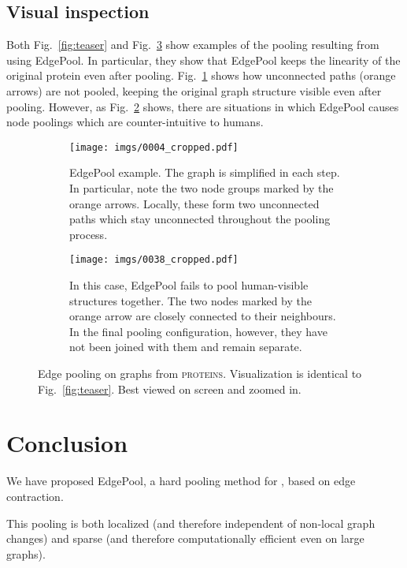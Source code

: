 \documentclass{article}
\newcommand{\figref}[1]{Fig.~\ref{#1}}
\newcommand{\edgepool}{EdgePool}
\newcommand{\datasetname}[1]{\textsc{#1}}
\newcommand{\proteins}{\datasetname{proteins}}
\begin{document}
\subsection{Visual inspection}

Both \figref{fig:teaser} and \figref{fig:plotted_graphs} show examples of the pooling resulting from using \edgepool{}. In particular, they show that \edgepool{} keeps the linearity of the original protein even after pooling. \figref{fig:pooling_example} shows how unconnected paths (orange arrows) are not pooled, keeping the original graph structure visible even after pooling. However, as \figref{fig:failure_case} shows, there are situations in which \edgepool{} causes node poolings which are counter-intuitive to humans.

\begin{figure}
	\centering
	\begin{subfigure}[b]{1.0\textwidth}
	\centering
	\texttt{[image: imgs/0004\_cropped.pdf]}
	\caption{\edgepool{} example. The graph is simplified in each step. In particular, note the two node groups marked by the orange arrows. Locally, these form two unconnected paths which stay unconnected throughout the pooling process.}
	\label{fig:pooling_example}
	\end{subfigure}

	\begin{subfigure}[b]{1.0\textwidth}
	\centering
	\texttt{[image: imgs/0038\_cropped.pdf]}
	\caption{In this case, \edgepool{} fails to pool human-visible structures together. The two nodes marked by the orange arrow are closely connected to their neighbours. In the final pooling configuration, however, they have not been joined with them and remain separate.}
	\label{fig:failure_case}
	\end{subfigure}
	\caption{Edge pooling on graphs from \proteins{}. Visualization is identical to \figref{fig:teaser}. Best viewed on screen and zoomed in.}
	\label{fig:plotted_graphs}
\end{figure}
 
\section{Conclusion}

We have proposed \edgepool{}, a hard pooling method for , based on edge contraction.

This pooling is both localized (and therefore independent of non-local graph changes) and sparse (and therefore computationally efficient even on large graphs). 
\end{document}
